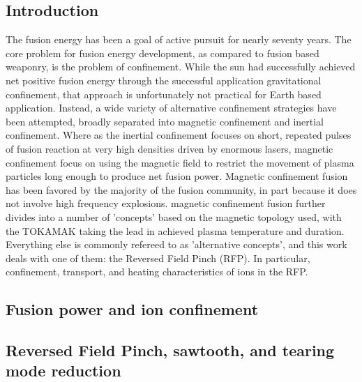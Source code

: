 \begin{refsection}


\chapter{Introduction}
The fusion energy has been a goal of active pursuit for nearly seventy years.
The core problem for fusion energy development, as compared to fusion based
weaponry, is the problem of confinement. While the sun had successfully
achieved net positive fusion energy through the successful application
gravitational confinement, that approach is unfortunately not practical for
Earth based application. Instead, a wide variety of alternative confinement
strategies have been attempted, broadly separated into magnetic confinement and
inertial confinement. Where as the inertial confinement focuses on short,
repeated pulses of fusion reaction at very high densities driven by enormous
lasers, magnetic confinement focus on using the magnetic field to restrict the
movement of plasma particles long enough to produce net fusion power. Magnetic
confinement fusion has been favored by the majority of the fusion community, in
part because it does not involve high frequency explosions. magnetic
confinement fusion further divides into a number of 'concepts' based on the
magnetic topology used, with the TOKAMAK taking the lead in achieved plasma
temperature and duration. Everything else is commonly refereed to as
'alternative concepts', and this work deals with one of them: the Reversed
Field Pinch (RFP). In particular, confinement, transport, and heating
characteristics of ions in the RFP.

\section{Fusion power and ion confinement}

\section{Reversed Field Pinch, sawtooth, and tearing mode reduction}


\end{refsection}
